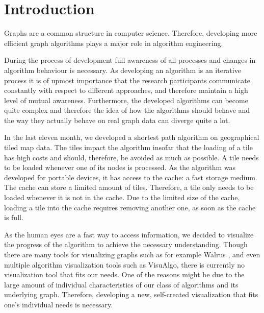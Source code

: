 \documentclass
[
    paper = a4,
    pagesize,
    12 pt,
    twoside,                       %
    open = right,
    DIV = calc,
    BCOR = 0 mm,                   %
    bibtotoc
]
{scrbook}
\begin{document}
\frontmatter


\newpage\null\thispagestyle{empty}\newpage


\newpage\null\thispagestyle{empty}\newpage
{}




\mainmatter
\chapter{Introduction} \label{introduction}
Graphs are a common structure in computer science.
Therefore, developing more efficient graph algorithms plays a major role in algorithm engineering.

During the process of development full awareness of all processes and changes in algorithm behaviour is necessary.
As developing an algorithm is an iterative process it is of upmost importance that the research participants communicate constantly with respect to different approaches, and therefore maintain a high level of mutual awareness.
Furthermore, the developed algorithms can become quite complex and therefore the idea of how the algorithms should behave and the way they actually behave on real graph data can diverge quite a lot.

In the last eleven month, we developed a shortest path algorithm on geographical tiled map data.
The tiles impact the algorithm insofar that the loading of a tile has high costs and should, therefore, be avoided as much as possible.
A tile needs to be loaded whenever one of its nodes is processed.
As the algorithm was developed for portable devices, it has access to the cache: a fast storage medium.
The cache can store a limited amount of tiles.
Therefore, a tile only needs to be loaded whenever it is not in the cache.
Due to the limited size of the cache, loading a tile into the cache requires removing another one, as soon as the cache is full.

As the human eyes are a fast way to access information, we decided to visualize the progress of the algorithm to achieve the necessary understanding.
Though there are many tools for visualizing graphs such as for example Walrus \cite{walrus}, and even multiple algorithm visualization tools such as VisuAlgo\cite{visualgo}, there is currently no visualization tool that fits our needs.
One of the reasons might be due to the large amount of individual characteristics of our class of algorithms and its underlying graph.
Therefore, developing a new, self-created visualization that fits one's individual needs is necessary.
\end{document}
